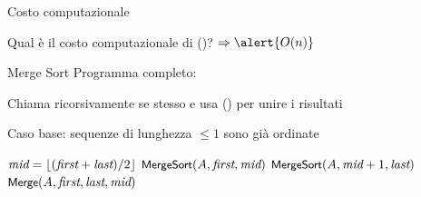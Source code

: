 \begin{frame}{Costo computazionale}

\begin{myboxtitle}[Domanda]
	Qual è il costo computazionale di \Merge()? \pause $\Rightarrow \alert{O(n)}$
\end{myboxtitle}

\end{frame}

\begin{frame}{Merge Sort}
Programma completo:
\BI
\item Chiama ricorsivamente se stesso e usa \Merge() per unire i risultati
\item Caso base: sequenze di lunghezza $\leq 1$ sono già ordinate
\EI	
\bigskip
\begin{Procedure}
\caption[A]{\Mergesort($\Item\ A[\ ]$, \INTEGER \Primo, \INTEGER \Ultimo)}

  \If{$\Primo < \Ultimo$}
  {
    \INTEGER $\textit{mid} = \lfloor(\textit{first} + \textit{last}) / 2\rfloor$ \;
	$\textsf{{\small MergeSort}}(A, \textit{first}, \textit{mid})$ \;
	$\textsf{{\small MergeSort}}(A, \textit{mid} + 1, \textit{last})$ \;
	$\textsf{{\small Merge}}(A, \textit{first}, \textit{last}, \textit{mid})$ \;
  }	
\end{Procedure}

\end{frame}

